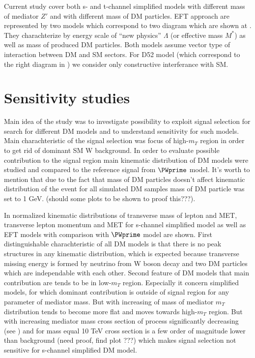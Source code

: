 Current study cover both s- and t-channel simplified models with different mass of mediator $Z'$ and with different mass of DM particles.
EFT approach are represented by two models which correspond to two diagram which are shown at . 
They charachterize by energy scale of ``new physics'' $\Lambda$ (or effective mass $M^{*}$) as well as mass of produced DM particles.
Both models assume vector type of interaction between DM and SM sectors. For D52 model (which correspond to the right diagram in  ) 
we consider only constructive interferance with SM.

\section{Sensitivity studies}

Main idea of the study was to investigate possibility to exploit signal selection for search for different DM models and to understand sensitivity for such models.
Main charachteristic of the signal selection was focus of high-$m_{T}$ region in order to get rid of dominant SM W background.
In order to evaluate possible contribution to the signal region main kinematic distribution of DM models were studied and compared to the reference signal from $\PWprime$ model.
It's worth to mention that due to the fact that mass of DM particles doesn't affect kinematic distribution of the event for all simulated DM samples mass of DM particle was set to 1 GeV.
(should some plots to be shown to proof this???).


In  normalized kinematic distributions of transverse mass of lepton and MET, transverse lepton momentum and MET 
for s-channel simplified model as well as EFT models with comparison with $\PWprime$ model are shown.
First distinguishable charachteristic of all DM models is that there is no peak structures in any kinematic distribution, which is expected because transverse missing energy is formed by
neutrino from W boson decay and two DM particles which are independable with each other. Second feature of DM models that main contribution are tends to be in low-$m_{T}$ region.
Especially it concern simplified models, for which dominant contribution is outside of signal region for any parameter of mediator mass.
But with increasing of mass of mediator $m_{T}$ distribution tends to become more flat and moves towards high-$m_{T}$ region.
But with increasing mediator mass cross section of process significantly decreasing (see ) 
and for mass equal 10 TeV cross section is a few order of magnitude lower than background (need proof, find plot ???) which makes signal selection not sensitive for s-channel simplified DM model.

